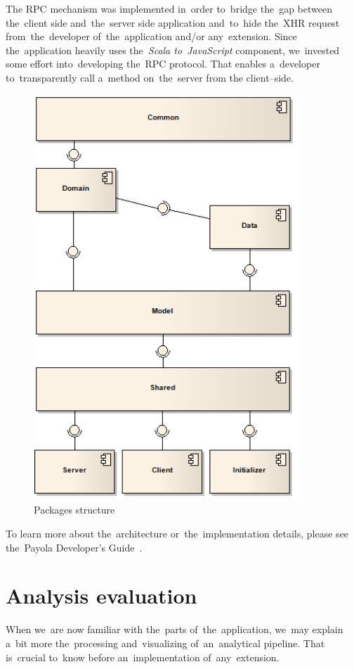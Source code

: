 The RPC mechanism was implemented in~order to~bridge the~gap between the~client 
side and~the~server side application and~to~hide the~XHR request from~the~developer of~the~application and/or any~extension. Since the~application heavily
uses the~\emph{Scala to~JavaScript} component, we~invested some effort into~developing the~RPC 
protocol. That enables a~developer to~transparently call a~method on~the~server from 
the client--side. 

\begin{figure}
	\centering
	\includegraphics[width=100mm]{images/project_dependencies.png}
	\caption{Packages structure}
	\label{fig:packages-structure}
\end{figure}

To learn more about the~architecture or~the~implementation details, please see the~Payola Developer's Guide~\cite{payola:dg}.

\section{Analysis evaluation}
When we~are now familiar with the~parts of~the~application, we~may explain a~bit more the~processing and~visualizing of~an~analytical pipeline. That is~crucial to~know before an~implementation of~any~extension.

